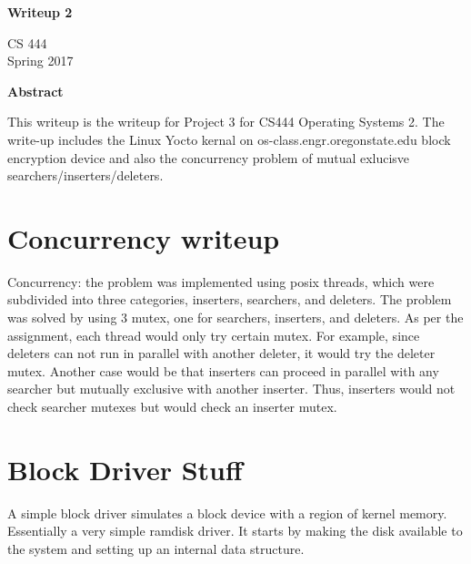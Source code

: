 \documentclass[letterpaper,10pt,titlepage]{article}
\begin{document}
\begin{titlepage}
    \begin{center}
        \vspace*{3.5cm}

        \textbf{Writeup 2}

        \vspace{0.5cm}
	
	\vspace{0.8cm}

        CS 444\\
        Spring 2017\\

        \vspace{1cm}

        \textbf{Abstract}\\

        \vspace{0.5cm}

		This writeup is the writeup for Project 3 for CS444 Operating Systems 2.  The write-up includes the Linux Yocto kernal on os-class.engr.oregonstate.edu block encryption device and also the concurrency problem of mutual exlucisve searchers/inserters/deleters.

        \vfill

    \end{center}
\end{titlepage}

\newpage

\tableofcontents

\newpage

\section{Concurrency writeup}
Concurrency: the problem was implemented using posix threads, which were subdivided into three categories, inserters, searchers, and deleters.  The problem was solved by using 3 mutex, one for searchers, inserters, and deleters.  As per the assignment, each thread would only try certain mutex.  For example, since deleters can not run in parallel with another deleter, it would try the deleter mutex.  Another case would be that inserters can proceed in parallel with any searcher but mutually exclusive with another inserter.  Thus, inserters would not check searcher mutexes but would check an inserter mutex.

\section{Block Driver Stuff}
A simple block driver simulates a block device with a region of kernel memory.  Essentially a very simple ramdisk driver.  It starts by making the disk available to the system and setting up an internal data structure.
\end{document}
